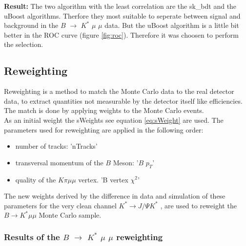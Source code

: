 \documentclass[english]{uzhpub}
\begin{document}
 \textbf{Result:} The two algorithm with the least correlation are the sk\_bdt and the uBoost algorithms. Therfore they most suitable to seperate between signal and background in the $B$ $\rightarrow$ $K^{*}$ $\mu$ $\mu$ data. But the uBoost algorithm is a little bit better in the ROC curve (figure \ref{fig:roc}). Therefore it was choosen to perform the selection.



 \subsection{Reweighting} \label{sec:Reweight}


Reweighting is a method to match the Monte Carlo data to the real detector data, to extract quantities not measurable by the detector itself like efficiencies. The match is done by applying weights to the Monte Carlo events. \\
As an initial weight the sWeights see equation \ref{eq:sWeight} are used. The parameters used for reweighting are applied in the following order:
\begin{itemize}
  \item number of tracks: 'nTracks'
  \item transversal momentum of the $B$ Meson: '$B$ $p_T$'
  \item quality of the $K \pi \mu \mu$ vertex. 'B vertex $\chi^2$'
\end{itemize}
The new weights derived by the difference in data and simulation of these parameters for the very clean channel $K^* \rightarrow J/ \Psi K^{*}$ \cite{bib:JPsi}, are used to reweight the $B \rightarrow K^* \mu \mu$ Monte Carlo sample.

\subsubsection{Results of the $B$ $\rightarrow$ $K^{*}$ $\mu$ $\mu$ reweighting}
\end{document}
